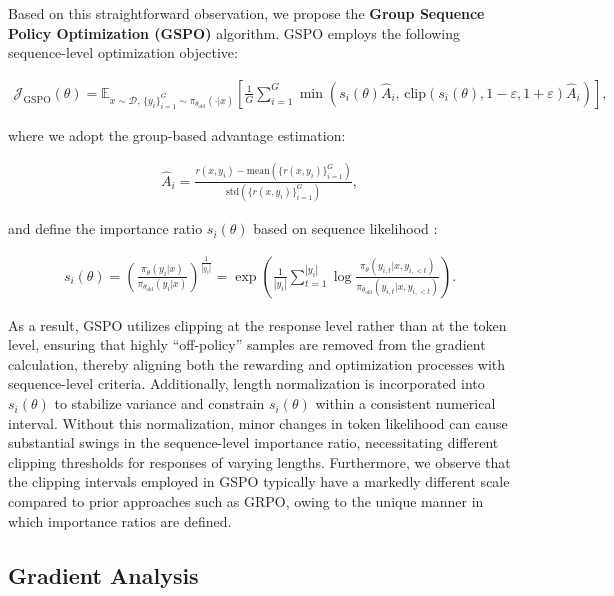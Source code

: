 Based on this straightforward observation, we propose the \textbf{Group Sequence Policy Optimization (GSPO)} algorithm. GSPO employs the following sequence-level optimization objective:

\begin{align}
\mathcal{J}_\text{GSPO} (\theta) =
\mathbb{E}_{ x \sim \mathcal{D},\, \{y_i\}_{i=1}^G \sim \pi_{\theta_\text{old}}( \cdot | x) }
\left[ 
\frac{1}{G} \sum_{i=1}^{G}
\min \left( s_{i}(\theta)  \widehat{A}_{i},  \, \mathrm{clip} \left( s_{i}(\theta), 1 - {\varepsilon}, 1 + {\varepsilon} \right) \widehat{A}_{i} \right) 
\right],
\label{equ:gspo}
\end{align}

where we adopt the group-based advantage estimation:

\begin{align}
\widehat{A}_{i} = \frac{r(x, y_i) - \mathrm{mean} \left( \{ r(x, y_i) \}_{i=1}^G \right) }{ \mathrm{std} \left( \{ r(x, y_i) \}_{i=1}^G \right) },
\end{align}

and define the importance ratio $s_{i}(\theta)$ based on sequence likelihood \citep{click}:

\begin{align}
s_{i}(\theta) = \left( \frac{ \pi_{\theta} (y_i | x) }{ \pi_{\theta_\text{old}} (y_i | x)} \right)^{\frac{1}{|y_i|}}
=
\exp \left( \frac{1}{|y_i|} \sum_{t=1}^{|y_i|} \log \frac{ \pi_{\theta} (y_{i,t} | x, y_{i,<t}) }{ \pi_{\theta_\text{old}} (y_{i,t} | x,y_{i,<t})} \right).
\end{align}

As a result, GSPO utilizes clipping at the response level rather than at the token level, ensuring that highly ``off-policy'' samples are removed from the gradient calculation, thereby aligning both the rewarding and optimization processes with sequence-level criteria. Additionally, length normalization is incorporated into $s_{i}(\theta)$ to stabilize variance and constrain $s_{i}(\theta)$ within a consistent numerical interval. Without this normalization, minor changes in token likelihood can cause substantial swings in the sequence-level importance ratio, necessitating different clipping thresholds for responses of varying lengths. Furthermore, we observe that the clipping intervals employed in GSPO typically have a markedly different scale compared to prior approaches such as GRPO, owing to the unique manner in which importance ratios are defined.

\subsection{Gradient Analysis}
\label{subsec:gradient}

